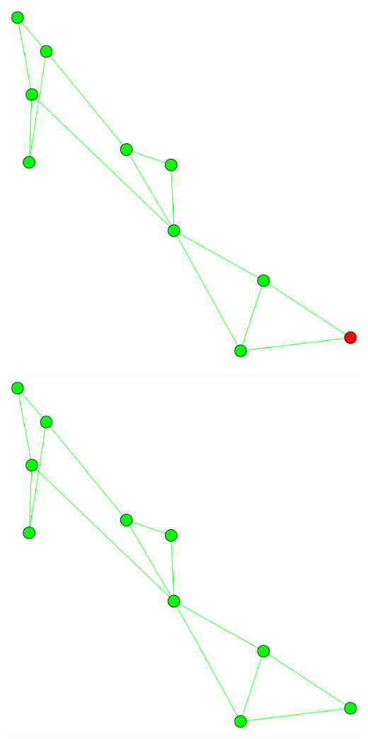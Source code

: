 \documentclass[12pt]{article}
\begin{document}
\begin{minipage}[t]{0.3\textwidth}
\includegraphics[width=\textwidth]{cascadeHomo/cascade2.png}
\end{minipage}
\begin{minipage}[t]{0.3\textwidth}
\includegraphics[width=\textwidth]{cascadeHomo/cascade3.png}
\end{minipage}
\end{document}
